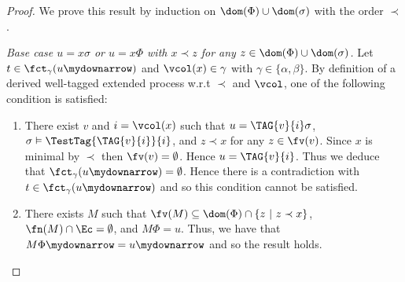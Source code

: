\begin{proof}
We prove this result by induction on $\dom(\Phi) \cup \dom(\sigma)$
with the order $\prec$.

\smallskip{}

\noindent \emph{Base case $u = x\sigma$ or $u = x\Phi$ with $x \prec
  z$ for any $z \in \dom(\Phi) \cup \dom(\sigma)$.} Let $t \in \fct_\gamma(u\mydownarrow)$ and $\vcol(x) \in \gamma$ with $\gamma \in \{\alpha,\beta\}$.
By definition of a derived well-tagged extended process w.r.t $\prec$ and $\vcol$, one of the
following condition is satisfied:
\begin{enumerate}
\item There exist $v$ and $i = \vcol(x)$ such that $u
=\TAG{v}{i}\sigma$, $\sigma \vDash \TestTag{\TAG{v}{i}}{i}$, and $z
\prec x$ for any $z \in \fv(v)$. Since $x$ is minimal by $\prec$ then $\fv(v)  = \emptyset$. Hence $u = \TAG{v}{i}$. Thus we deduce that $\fct_\gamma(u\mydownarrow) = \emptyset$. Hence there is a contradiction with $t \in \fct_\gamma(u\mydownarrow)$ and so this condition cannot be satisfied.
\item There exists $M$ such that $\fv(M) \subseteq \dom(\Phi) \cap \{z
  ~|~ z \prec x\}$, $\fn(M) \cap \Ec = \emptyset$, and $M\Phi =
  u$. Thus, we have that $M\Phi\mydownarrow = u\mydownarrow$ and so the result holds.
  \end{enumerate}
  
  \medskip{}
  

\end{proof}
